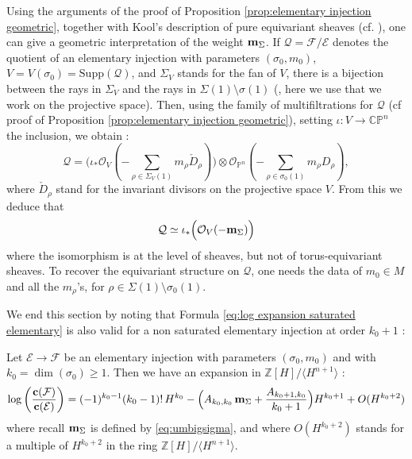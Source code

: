 \documentclass[a4paper,10pt]{amsart}
\theoremstyle{plain}{
    \newtheorem{theorem}{Theorem}[section]
    \newtheorem{lemma}[theorem]{Lemma}
    \newtheorem{corollary}[theorem]{Corollary}
    \newtheorem{proposition}[theorem]{Proposition}
    \newtheorem{conjecture}[theorem]{Conjecture}
}
\theoremstyle{definition}{
    \newtheorem{definition}[theorem]{Definition}
    \newtheorem{defn-thm}[theorem]{Definition-Theorem}
    \newtheorem{example}[theorem]{Example}
    \newtheorem{notation}[theorem]{Notation}
}
\theoremstyle{remark}{
    \newtheorem{remark}[theorem]{Remark}
    \newtheorem{problem}[theorem]{Problem}
    \newtheorem{question}[theorem]{Question}
}
\def\um{{\bf m}}
\def\uc{{\bf c}}
\def\cF{\mathcal{F}}
\def\cE{\mathcal{E}}
\def\cO{\mathcal{O}}
\def\cQ{\mathcal{Q}}
\def\Z{\mathbb{Z}}
\def\P{\mathbb{P}}
\def\C{\mathbb{C}}
\begin{document}
\begin{remark}
 \label{rem:interpretation of weights}
 Using the arguments of the proof of Proposition \ref{prop:elementary injection geometric}, together with Kool's description of pure equivariant sheaves (cf. \cite[Proposition 2.8 and Theorem 2.10]{Koo11}), one can give a geometric interpretation of the weight $\um_\Sigma$. If $\cQ=\cF/\cE$ denotes the quotient of an elementary injection with parameters $(\sigma_0,m_0)$, $V=V(\sigma_0)=\mathrm{Supp}(\cQ)$, and $\Sigma_V$ stands for the fan of $V$, there is a bijection between the rays in $\Sigma_V$ and the rays in $\Sigma(1)\setminus\sigma(1)$ (\cite[Section 3.2]{CLS}, here we use that we work on the projective space). Then, using the family of multifiltrations for $\cQ$ (cf proof of Proposition \ref{prop:elementary injection geometric}), setting $\iota : V \to \C\P^n$ the inclusion, we obtain :
 $$
 \cQ=\Big(\iota_*\cO_V(-\sum_{\rho\in\Sigma_V(1)}m_\rho \check D_\rho)\Big)\otimes \cO_{\P^n}(-\sum_{\rho\in\sigma_0(1)} m_\rho D_\rho),
 $$
 where $\check D_\rho$ stand for the invariant divisors on the projective space $V$. From this we deduce that
 $$
 \cQ\simeq \iota_*\Big(\cO_{V}(-\um_\Sigma)\Big)
 $$
 where the isomorphism is at the level of sheaves, but not of torus-equivariant sheaves. To recover the equivariant structure on $\cQ$, one needs the data of $m_0\in M$ and all the $m_\rho$'s, for $\rho\in \Sigma(1)\setminus\sigma_0(1)$.
\end{remark}
We end this section by noting that Formula \eqref{eq:log expansion saturated elementary} is also valid for a non saturated elementary injection at order $k_0+1$ :
\begin{proposition}
 \label{prop:log expansion chern non saturated}
  Let $\cE\to \cF$ be an elementary injection with parameters $(\sigma_0,m_0)$ and with $k_0=\dim(\sigma_0)\geq 1$. Then we have an expansion in $\Z[H]/\langle H^{n+1} \rangle$ :
 \begin{equation*}
  \label{eq:log expansion non saturated}
  \log\left(\frac{\uc(\cF)}{\uc(\cE)}\right)=(-1)^{k_0-1}(k_0-1)! \, H^{k_0}-\Big(A_{k_0,k_0}\, \um_\Sigma + \frac{A_{k_0+1,k_0}}{k_0+1} \Big)H^{k_0+1} + O(H^{k_0+2})
 \end{equation*}
 where recall $\um_\Sigma$ is defined by \eqref{eq:umbigsigma}, and where $O(H^{k_0+2})$ stands for a multiple of $H^{k_0+2}$ in the ring $\Z[H]/\langle H^{n+1} \rangle$.
 \end{proposition}
\end{document}
